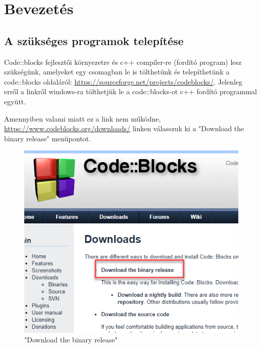 \chapter{Bevezetés} %
\label{ch:bevezetes}

\section{A szükséges programok telepítése}

Code::blocks fejlesztői környezetre és c++ compiler-re (fordító program) lesz szükségünk, amelyeket egy csomagban le is tölthetünk és telepíthetünk a code::blocks oldaláról: \url{https://sourceforge.net/projects/codeblocks/}. Jelenleg erről a linkről windows-ra tölthetjük le a code::blocks-ot c++ fordító programmal együtt. 

Amennyiben valami miatt ez a link nem működne, \url{https://www.codeblocks.org/downloads/} linken válasszuk ki a "Download the binary release" menüpontot.

\begin{figure}[H]
	\centering
	\includegraphics[width=0.6\linewidth]{images/bevezetes/choose}
	\caption{"Download the binary release"}
	\label{fig:choose}
\end{figure}
